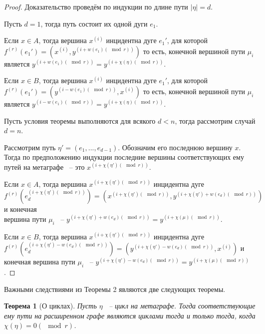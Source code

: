 \documentclass[14pt]{mmcs-article}
\newtheorem{theorem}{Теорема}
\begin{document}
\begin{proof}

Доказательство проведём по индукции по длине пути $|\eta| = d$.

Пусть $d = 1$, тогда путь состоит их одной дуги $e_1$.

Если $x \in A$, тогда вершина $x^{(i)}$ инцидентна дуге $e_1'$, для которой $f^{(r)}(e_1') = (x^{(i)}, y^{(i + w(e_1) (\mod{r}))})$ то есть, конечной вершиной пути $\mu_i$ является $y^{(i + w(e_1) (\mod{r}))} = y^{(i + \chi(\eta) (\mod{r}))}$.

Если $x \in B$, тогда вершина $x^{(i)}$ инцидентна дуге $e_1'$, для которой $f^{(r)}(e_1') = (y^{(i - w(e_1) (\mod{r}))}, x^{(i)})$ то есть, конечной вершиной пути $\mu_i$ является $y^{(i - w(e_1) (\mod{r}))} = y^{(i + \chi(\eta) (\mod{r}))}$.

Пусть условия теоремы выполняются для всякого $d < n$, тогда рассмотрим случай $d = n$.

Рассмотрим путь $\eta' = (e_1, ..., e_{d - 1})$. Обозначим его последнюю вершину $x$. Тогда по предположению индукции последние вершины соответствующих ему путей на метаграфе ~-- это $x^{(i + \chi(\eta')(\mod{r}))}$.

Если $x \in A$, тогда вершина $x^{(i + \chi(\eta')(\mod{r}))}$ инцидентна дуге \\ $f^{(r)}(e_d^{(i + \chi(\eta')(\mod{r}))}) = (x^{(i + \chi(\eta')(\mod{r}))}, y^{(i + \chi(\eta') + w(e_d) (\mod{r}))})$ и конечная \\ вершина пути $\mu_i$ ~-- $y^{(i + \chi(\eta') + w(e_d) (\mod{r}))} = y^{(i + \chi(\mu) (\mod{r}))}$.

Если $x \in B$, тогда вершина $x^{(i + \chi(\eta')(\mod{r}))}$ инцидентна дуге \\ $f^{(r)}(e_d^{(i + \chi(\eta') - w(e_d) (\mod{r}))}) = (y^{(i + \chi(\eta') - w(e_d) (\mod{r}))}, x^{(i)})$ и конечная вершина пути $\mu_i$ ~-- $y^{(i + \chi(\eta') - w(e_d) (\mod{r}))} = y^{(i + \chi(\mu) (\mod{r}))}$.

\end{proof}

Важными следствиями из Теоремы 2 являются две следующих теоремы.

\begin{theorem}[О циклах]

Пусть $\eta$ ~-- цикл на метаграфе. Тогда соответствующие ему пути на расширенном графе являются циклами тогда и только тогда, когда $\chi(\eta) = 0 (\mod{r})$.

\end{theorem}
\end{document}
